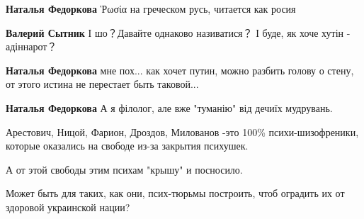 \begin{itemize}
\begin{itemize}
\textbf{Наталья Федоркова} Ῥωσία на греческом русь, читается как росия

\begin{itemize}
 
\textbf{Валерий Сытник} І шо？Давайте однаково називатися？ І буде, як хоче хутін - адіннарот？

 
\textbf{Наталья Федоркова} мне пох... как хочет путин, можно разбить голову о стену, от этого истина не перестает быть таковой...
\end{itemize}

 
\textbf{Наталья Федоркова} А я філолог, але вже "туманію" від дечиїх мудрувань.

\end{itemize}

 

Арестович, Ницой, Фарион, Дроздов, Милованов -это 100\% психи-шизофреники,
которые оказались на свободе из-за закрытия психушек.

А от этой свободы этим психам "крышу" и посносило.

Может быть для таких, как они, псих-тюрьмы построить, чтоб оградить их от
здоровой украинской нации?


 


\end{itemize}
